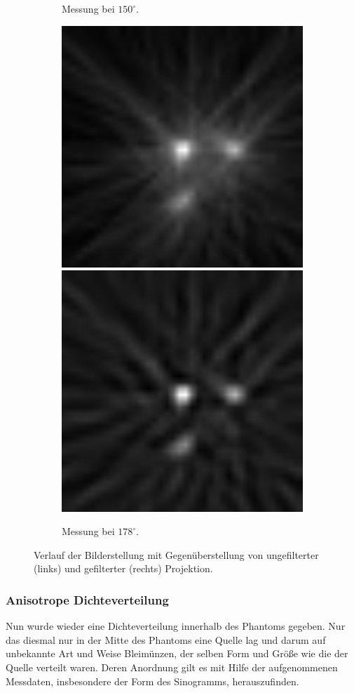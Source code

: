 \documentclass[slug=PET, room=Andreas-Schubert-Bau\,\ 424A, supervisor=Carsten\ Bittrich, coursedate=10.\ 01.\ 2020]{../../Lab_Report_LaTeX/lab_report}
\begin{document}
\begin{figure}
\begin{subfigure}{0.5\textwidth}
		\caption{Messung bei \(150^\circ\).}
	\end{subfigure}
	\begin{subfigure}{0.5\textwidth}
		\centering
		\includegraphics[width=.4\textwidth]{../messungen/oliTOM1/15_einfach.png}
		\includegraphics[width=.4\textwidth]{../messungen/oliTOM1/15_gefiltert.png}
		\caption{Messung bei \(178^\circ\).}
	\end{subfigure}
	\caption{Verlauf der Bilderstellung mit Gegenüberstellung von ungefilterter (links) und gefilterter (rechts) Projektion.}
	\label{fig:tom1}
\end{figure}

\subsubsection{Anisotrope Dichteverteilung}
\label{sec:tom2}

Nun wurde wieder eine Dichteverteilung innerhalb des Phantoms gegeben. Nur das diesmal nur in der
Mitte des Phantoms eine Quelle lag und darum auf unbekannte Art und Weise Bleimünzen, der selben
Form und Größe wie die der Quelle verteilt waren. Deren Anordnung gilt es mit Hilfe der
aufgenommenen Messdaten, insbesondere der Form des Sinogramms, herauszufinden.
\end{document}
